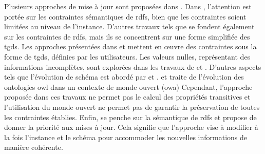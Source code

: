 Plusieurs approches de mise à jour sont proposées dans \cite{flourisFormalFoundationsRDF2013,goasdoueEfficientQueryAnswering2013,mahfoudhAdaptationOntologiesAvec2015,halfedferrariRDFUpdatesConstraints2017,chabinUsingGraphGrammar2019,chabinConsistentUpdatingDatabases2020}.
Dans \cite{goasdoueEfficientQueryAnswering2013}, l'attention est portée sur les contraintes sémantiques de \gls{rdfs}, bien que les contraintes soient limitées au niveau de l'instance.
D'autres travaux tels que \cite{halfedferrariRDFUpdatesConstraints2017} se fondent également sur les contraintes de \gls{rdfs}, mais ils se concentrent sur une forme simplifiée des \glspl{tgd}.
Les approches présentées dans \cite{flourisFormalFoundationsRDF2013} et \cite{chabinUsingGraphGrammar2019} mettent en œuvre des contraintes sous la forme de \glspl{tgd}, définies par les utilisateurs.
Les valeurs nulles, représentant des informations incomplètes, sont explorées dans les travaux de \cite{halfedferrariRDFUpdatesConstraints2017} et \cite{chabinUsingGraphGrammar2019}.
D'autres aspects tels que l'évolution de schéma est abordé par \cite{flourisFormalFoundationsRDF2013} et \cite{goasdoueEfficientQueryAnswering2013}.
\cite{mahfoudhAdaptationOntologiesAvec2015} et \cite{mahfoudhAlgebraicGraphTransformations2015} traite de l'évolution des ontologies \gls{owl} dans un contexte de monde ouvert (\acs{owa})
Cependant, l'approche proposée dans ces travaux ne permet pas le calcul des propriétés transitives et l'utilisation du monde ouvert ne permet pas de garantir la préservation de toutes les contraintes établies.
Enfin, \cite{chabinUsingGraphGrammar2019} se penche sur la sémantique de \gls{rdfs} et propose de donner la priorité aux mises à jour.
Cela signifie que l'approche vise à modifier à la fois l'instance et le schéma pour accommoder les nouvelles informations de manière cohérente.

